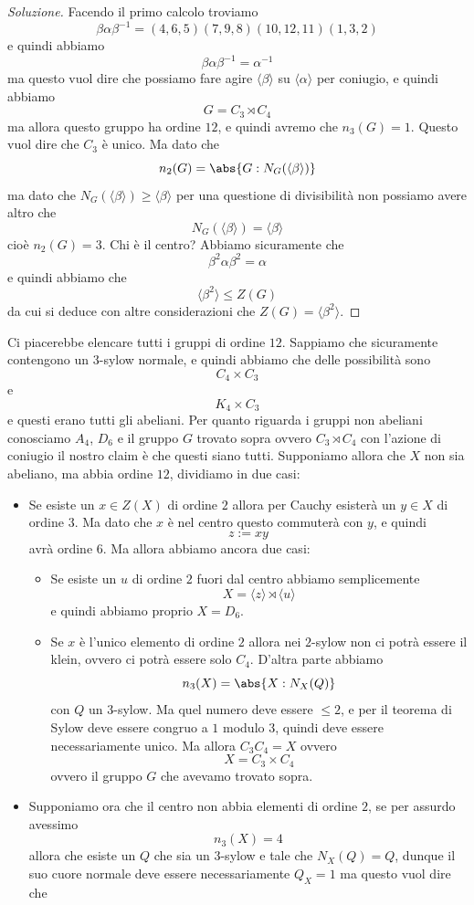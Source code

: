 \documentclass[11pt]{scrartcl}
\begin{document}
	\begin{proof}[Soluzione]
		Facendo il primo calcolo troviamo
		$$\beta \alpha \beta^{-1}=(4,6,5)(7,9,8)(10,12,11)(1,3,2)$$
		e quindi abbiamo
		$$\beta \alpha \beta^{-1}=\alpha^{-1}$$
		ma questo vuol dire che possiamo fare agire $\langle \beta\rangle$ su $\langle \alpha\rangle$ per coniugio, e quindi abbiamo
		$$G=C_3\rtimes C_4$$
		ma allora questo gruppo ha ordine $12$, e quindi avremo che $n_3(G)=1$. Questo vuol dire che $C_3$ è unico. Ma dato che 
		$$n_2(G)=\abs{G:N_G(\langle \beta \rangle)}$$
		ma dato che $N_G(\langle \beta \rangle)\ge \langle \beta \rangle$ per una questione di divisibilità non possiamo avere altro che
		$$N_G(\langle \beta \rangle)=\langle \beta \rangle$$ 
		cioè $n_2(G)=3$. Chi è il centro? Abbiamo sicuramente che 
		$$\beta^2\alpha \beta^2=\alpha$$
		e quindi abbiamo che
		$$\langle \beta^2\rangle \le Z(G)$$
		da cui si deduce con altre considerazioni che $Z(G)=\langle \beta^2\rangle$. 
	\end{proof}
	Ci piacerebbe elencare tutti i gruppi di ordine $12$. Sappiamo che sicuramente contengono un $3$-sylow normale, e quindi abbiamo che delle possibilità sono
	$$C_4\times C_3$$
	e 
	$$K_4\times C_3$$
	e questi erano tutti gli abeliani. Per quanto riguarda i gruppi non abeliani conosciamo $A_4$, $D_6$ e il gruppo $G$ trovato sopra ovvero $C_3\rtimes C_4$ con l'azione di coniugio il nostro claim è che questi siano tutti. Supponiamo allora che $X$ non sia abeliano, ma abbia ordine $12$, dividiamo in due casi:
	\begin{itemize}
		\item Se esiste un $x\in Z(X)$ di ordine $2$ allora per Cauchy esisterà un $y\in X$ di ordine $3$. Ma dato che $x$ è nel centro questo commuterà con $y$, e quindi 
		$$z:=xy$$
		avrà ordine $6$. Ma allora abbiamo ancora due casi: 
		\begin{itemize}
			\item Se esiste un $u$ di ordine $2$ fuori dal centro abbiamo semplicemente
			$$X=\langle z \rangle \rtimes \langle u \rangle$$
			e quindi abbiamo proprio $X=D_6$.
			\item Se $x$ è l'unico elemento di ordine $2$ allora nei $2$-sylow non ci potrà essere il klein, ovvero ci potrà essere solo $C_4$. D'altra parte abbiamo
			$$n_3(X)=\abs{X:N_X(Q)}$$
			con $Q$ un $3$-sylow. Ma quel numero deve essere $\le 2$, e per il teorema di Sylow deve essere congruo a $1$ modulo $3$, quindi deve essere necessariamente unico. Ma allora $C_3C_4=X$ ovvero
			$$X=C_3\times C_4$$
			ovvero il gruppo $G$ che avevamo trovato sopra.
		\end{itemize}
		\item Supponiamo ora che il centro non abbia elementi di ordine $2$, se per assurdo avessimo 
		$$n_3(X)=4$$
		allora che esiste un $Q$ che sia un $3$-sylow e tale che $N_X(Q)=Q$, dunque il suo cuore normale deve essere necessariamente $Q_X=1$ ma questo vuol dire che 
	\end{itemize}
\end{document}

